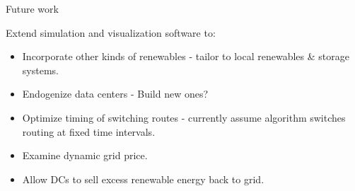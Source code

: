 \documentclass[xcolor=dvipsnames]{beamer}
\begin{document}

\begin{frame}{Future work}

Extend simulation and visualization software to:

\begin{itemize}
\item Incorporate other kinds of renewables - tailor to local renewables \& storage systems.
\item Endogenize data centers - Build new ones? 
\item Optimize timing of switching routes - currently assume algorithm switches routing at fixed time intervals. 
\item Examine dynamic grid price.  
\item Allow DCs to sell excess renewable energy back to grid.
\end{itemize}

\end{frame}
\end{document}
